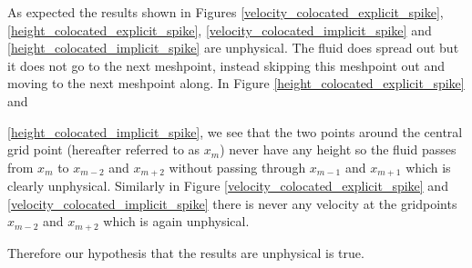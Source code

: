\documentclass[a4paper,12pt, notitlepage]{article}
\begin{document}
As expected the results shown in Figures \ref{velocity_colocated_explicit_spike}, \ref{height_colocated_explicit_spike}, \ref{velocity_colocated_implicit_spike} and \ref{height_colocated_implicit_spike} are unphysical. The fluid does spread out but it does not go to the next meshpoint, instead skipping this meshpoint out and moving to the next meshpoint along. In Figure \ref{height_colocated_explicit_spike} and {\ref{height_colocated_implicit_spike}, we see that the two points around the central grid point (hereafter referred to as $x_{m}$) never have any height so the fluid passes from $x_{m}$ to $x_{m-2}$ and $x_{m+ 2}$ without passing through $x_{m-1}$ and $x_{m+1}$ which is clearly unphysical. Similarly in Figure \ref{velocity_colocated_explicit_spike} and \ref{velocity_colocated_implicit_spike} there is never any velocity at the gridpoints $x_{m-2}$ and $x_{m+2}$ which is again unphysical. 
	
Therefore our hypothesis that the results are unphysical is true.

}
\end{document}
